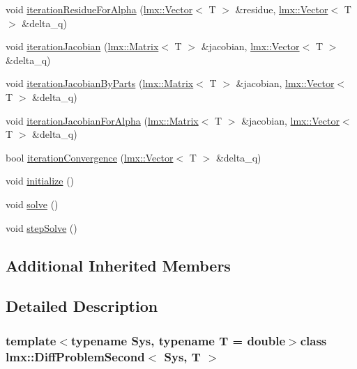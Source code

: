 \begin{DoxyCompactItemize}
void \hyperlink{classlmx_1_1DiffProblemSecond_aa4105b5701d95df754a990eaca6258f9}{iteration\-Residue\-For\-Alpha} (\hyperlink{classlmx_1_1Vector}{lmx\-::\-Vector}$<$ T $>$ \&residue, \hyperlink{classlmx_1_1Vector}{lmx\-::\-Vector}$<$ T $>$ \&delta\-\_\-q)
\item 
void \hyperlink{classlmx_1_1DiffProblemSecond_a8384c52d627da6e6d45751ecbcc0e0c7}{iteration\-Jacobian} (\hyperlink{classlmx_1_1Matrix}{lmx\-::\-Matrix}$<$ T $>$ \&jacobian, \hyperlink{classlmx_1_1Vector}{lmx\-::\-Vector}$<$ T $>$ \&delta\-\_\-q)
\item 
void \hyperlink{classlmx_1_1DiffProblemSecond_aa0d019a19db665b77f8e44f13437c048}{iteration\-Jacobian\-By\-Parts} (\hyperlink{classlmx_1_1Matrix}{lmx\-::\-Matrix}$<$ T $>$ \&jacobian, \hyperlink{classlmx_1_1Vector}{lmx\-::\-Vector}$<$ T $>$ \&delta\-\_\-q)
\item 
void \hyperlink{classlmx_1_1DiffProblemSecond_aa6eb85defb1b13bb15d9a890016b22fc}{iteration\-Jacobian\-For\-Alpha} (\hyperlink{classlmx_1_1Matrix}{lmx\-::\-Matrix}$<$ T $>$ \&jacobian, \hyperlink{classlmx_1_1Vector}{lmx\-::\-Vector}$<$ T $>$ \&delta\-\_\-q)
\item 
bool \hyperlink{classlmx_1_1DiffProblemSecond_a784538dfb6712b3606834df79bb32b0f}{iteration\-Convergence} (\hyperlink{classlmx_1_1Vector}{lmx\-::\-Vector}$<$ T $>$ \&delta\-\_\-q)
\item 
void \hyperlink{classlmx_1_1DiffProblemSecond_ae5cbfe1812c68e4f488a71dfade3fd2b}{initialize} ()
\item 
void \hyperlink{classlmx_1_1DiffProblemSecond_ac871f9e8c3ee70c2bbc908406eac1480}{solve} ()
\item 
void \hyperlink{classlmx_1_1DiffProblemSecond_a8ad0c21a39238e01c957de51779ac17a}{step\-Solve} ()
\end{DoxyCompactItemize}
\subsection*{Additional Inherited Members}


\subsection{Detailed Description}
\subsubsection*{template$<$typename Sys, typename T = double$>$class lmx\-::\-Diff\-Problem\-Second$<$ Sys, T $>$}

